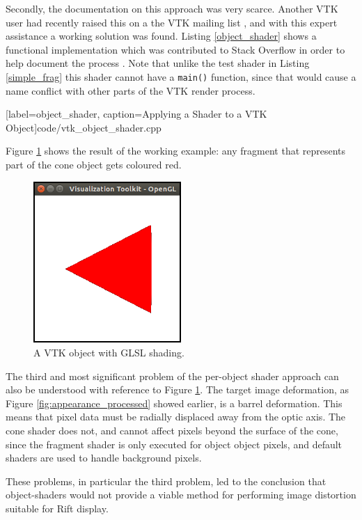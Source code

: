 \documentclass[MSc,paper=a4,pagesize=auto]{icldt}
\begin{document}
Secondly, the documentation on this approach was very scarce. Another VTK user had recently raised this on a the VTK mailing list \cite{vtk_shader_actor}, and with this expert assistance a working solution was found. Listing \ref{object_shader} shows a functional implementation which was contributed to Stack Overflow in order to help document the process \cite{SO_shader_actor}. Note that unlike the test shader in Listing \ref{simple_frag} this shader cannot have a \texttt{main()} function, since that would cause a name conflict with other parts of the VTK render process. 


  [label=object_shader, caption=Applying a Shader to a VTK Object]{code/vtk_object_shader.cpp}

Figure \ref{fig:object_shader} shows the result of the working example: any fragment that represents part of the cone object gets coloured red. 

\begin{figure}[htbp!]
    \centering
    \includegraphics[width=0.5\textwidth]{resources/object_shader}
    \caption{A VTK object with GLSL shading.}
    \label{fig:object_shader}
\end{figure}

The third and most significant problem of the per-object shader approach can also be understood with reference to Figure \ref{fig:object_shader}. The target image deformation, as Figure \ref{fig:appearance_processed} showed earlier, is a barrel deformation. This means that pixel data must be radially displaced away from the optic axis. The cone shader does not, and cannot affect pixels beyond the surface of the cone, since the fragment shader is only executed for object object pixels, and default shaders are used to handle background pixels.  

These problems, in particular the third problem, led to the conclusion that object-shaders would not provide a viable method for performing image distortion suitable for Rift display.
\end{document}
